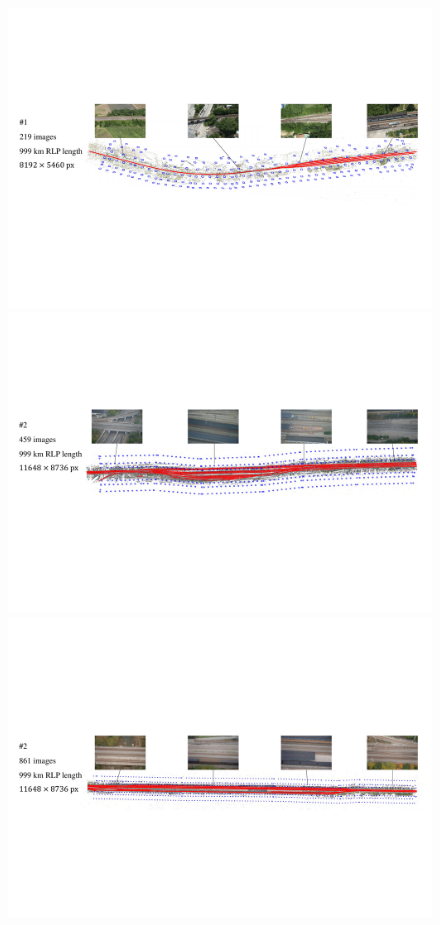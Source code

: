 
\begin{figure}
    \centering
    \includegraphics[width=0.95\linewidth]{images/datasets/D219.pdf}%
    \vspace{2em}
    \includegraphics[width=0.95\linewidth]{images/datasets/D459.pdf}%
    \vspace{2em}
    \includegraphics[width=0.95\linewidth]{images/datasets/D861.pdf}%

\end{figure}
